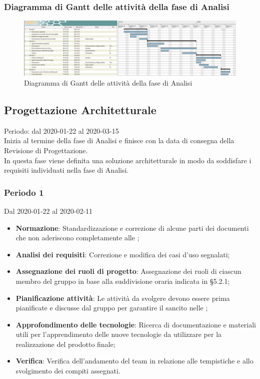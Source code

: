 \newpage
\begin{landscape}
\subsubsection{Diagramma di Gantt delle attività della fase di Analisi}
\pagestyle{empty}
\begin{figure}[h]
	\centering	
	\includegraphics[scale=0.455]{Sezioni/DiagrammiGantt/Analisi.png}
	\caption{Diagramma di Gantt delle attività della fase di Analisi}
\end{figure}
\end{landscape}
\clearpage

\subsection{Progettazione Architetturale}
Periodo: dal 2020-01-22 al 2020-03-15\\
Inizia al termine della fase di Analisi e finisce con la data di consegna della Revisione di Progettazione.\\
In questa fase viene definita una soluzione architetturale in modo da soddisfare i requisiti individuati nella fase di Analisi.

\subsubsection{Periodo 1} 
Dal 2020-01-22 al 2020-02-11
\begin{itemize}
	\item \textbf{Normazione}: Standardizzazione e correzione di alcune parti dei documenti che non aderiscono completamente alle \NdP{};
	\item \textbf{Analisi dei requisiti}: Correzione e modifica dei casi d'uso segnalati;
	\item \textbf{Assegnazione dei ruoli di progetto}: Assegnazione dei ruoli di ciascun membro del gruppo in base alla suddivisione oraria indicata in §5.2.1;
	\item \textbf{Pianificazione attività}: Le attività da svolgere devono essere prima pianificate e discusse dal gruppo per garantire il  sancito nelle \NdP{};
	\item \textbf{Approfondimento delle tecnologie}: Ricerca di documentazione e materiali utili per l'apprendimento delle nuove tecnologie da utilizzare per la realizzazione del prodotto finale;
	\item \textbf{Verifica}: Verifica dell'andamento del team in relazione alle tempistiche e allo svolgimento dei compiti assegnati.
\end{itemize}


